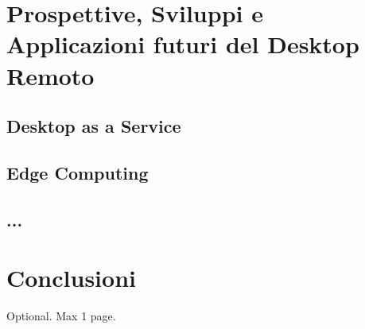 \documentclass[12pt,a4paper,openright,twoside]{book}
\begin{document}
\chapter{Prospettive, Sviluppi e Applicazioni futuri del Desktop Remoto}

\section{Desktop as a Service}

\section{Edge Computing}

\section{...}

\chapter{Conclusioni}
\label{chap:conclusions}


\backmatter

\nocite{*} %




\begin{acknowledgements} %
Optional. Max 1 page.
\end{acknowledgements}
\end{document}
